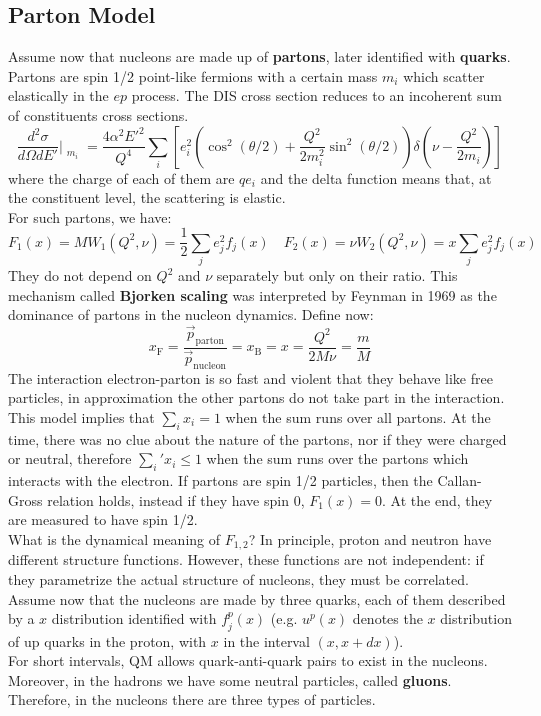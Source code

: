\documentclass[10.75pt,a4paper,openright,bottom=2cm]{article}
\begin{document}
\subsection{Parton Model}
Assume now that nucleons are made up of \textbf{partons}, later identified with \textbf{quarks}. Partons are spin 1/2 point-like fermions with a certain mass $m_i$  which scatter elastically in the $ep$ process. The DIS cross section reduces to an incoherent sum of constituents cross sections.
\[
\frac{d^2\sigma}{d\Omega dE'}\Bigr|_{\substack{m_i}}=\frac{4\alpha^2E'^2}{Q^4}\sum_i\left[e_i^2\left(\cos^2(\theta/2)+\frac{Q^2}{2m_i^2}\sin^2(\theta/2)\right)\delta\left(\nu-\frac{Q^2}{2m_i}\right)\right]
\]
where the charge of each of them are $qe_i$ and the delta function means that, at the constituent level, the scattering is elastic.\\
For such partons, we have:
\[
F_1(x)=MW_1(Q^2,\nu)=\frac{1}{2}\sum_je_j^2f_j(x) \quad F_2(x)=\nu W_2(Q^2,\nu)=x\sum_je_j^2f_j(x)
\]
They do not depend on $Q^2$ and $\nu$ separately but only on their ratio. This mechanism called \textbf{Bjorken scaling} was interpreted by Feynman in 1969 as the dominance of partons in the nucleon dynamics. 
Define now:
\[
x_{\text{F}}=\frac{\Vec{p}_{\text{parton}}}{\Vec{p}_{\text{nucleon}}}=x_{\text{B}}=x=\frac{Q^2}{2M\nu}=\frac{m}{M}
\]
The interaction electron-parton is so fast and violent that they behave like free particles, in  approximation the other partons do not take part in the interaction.\\
This model implies that $\sum_ix_i=1$ when the sum runs over all partons. At the time, there was no clue about the nature of the partons, nor if they were charged or neutral, therefore $\sum_i'x_i\le1$ when the sum runs over the partons which interacts with the electron. If partons are spin 1/2 particles, then the Callan-Gross relation holds, instead if they have spin 0, $F_1(x)=0$. At the end, they are measured to have spin 1/2.\\
What is the dynamical meaning of $F_{1,2}$? In principle, proton and neutron have different structure functions. However, these functions are not independent: if they parametrize the actual structure of nucleons, they must be correlated. Assume now that the nucleons are made by three quarks, each of them described by a $x$ distribution identified with $f_j^p(x)$ (e.g. $u^p(x)$ denotes the $x$ distribution of up quarks in the proton, with $x$ in the interval $(x,x+dx)$).\\
For short intervals, QM allows quark-anti-quark pairs to exist in the nucleons. Moreover, in the hadrons we have some neutral particles, called \textbf{gluons}. Therefore, in the nucleons there are three types of particles.
\end{document}
